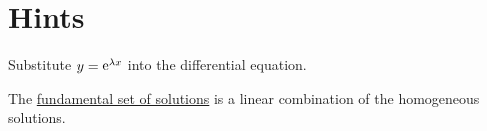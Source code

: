 \section{Hints}



\begin{Hint}
  \label{hint y+2ay+by}
  Substitute $y = \mathop{\mathrm{e}}\nolimits^{\lambda x}$ into the differential equation.
\end{Hint}



\begin{Hint}
  \label{hint fund set y+2ay+by}
  The 
  \hyperref[section The Fundamental Set of Solutions]
    {fundamental set of solutions}
  is a linear combination of the homogeneous solutions.
\end{Hint}









